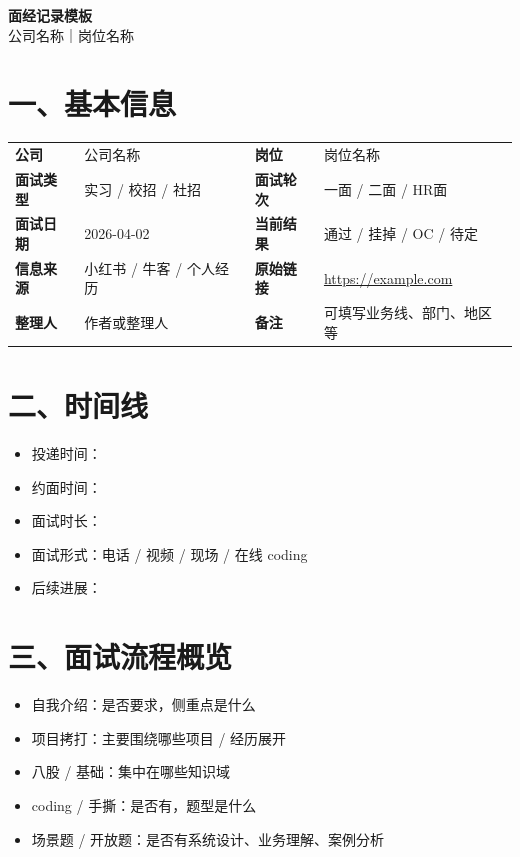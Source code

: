 \documentclass[UTF8,a4paper,11pt]{ctexart}
\newcommand{\Company}{公司名称}
\newcommand{\Role}{岗位名称}
\newcommand{\InterviewType}{实习 / 校招 / 社招}
\newcommand{\RoundInfo}{一面 / 二面 / HR面}
\newcommand{\ResultInfo}{通过 / 挂掉 / OC / 待定}
\newcommand{\InterviewDate}{2026-04-02}
\newcommand{\InterviewSource}{小红书 / 牛客 / 个人经历}
\newcommand{\OriginalLink}{https://example.com}
\newcommand{\AuthorName}{作者或整理人}
\begin{document}
\begin{center}
  {\LARGE \textbf{面经记录模板}}\\[0.5em]
  {\large \Company{}｜\Role}
\end{center}

\vspace{0.8em}

\section*{一、基本信息}

\begin{tabularx}{\textwidth}{>{\bfseries}p{}X>{\bfseries}p{}X}
\toprule
公司 & \Company & 岗位 & \Role \\
面试类型 & \InterviewType & 面试轮次 & \RoundInfo \\
面试日期 & \InterviewDate & 当前结果 & \ResultInfo \\
信息来源 & \InterviewSource & 原始链接 & \url{\OriginalLink} \\
整理人 & \AuthorName & 备注 & 可填写业务线、部门、地区等 \\
\bottomrule
\end{tabularx}

\section*{二、时间线}

\begin{itemize}
  \item 投递时间：\underline{\hspace{8em}}
  \item 约面时间：\underline{\hspace{8em}}
  \item 面试时长：\underline{\hspace{8em}}
  \item 面试形式：电话 / 视频 / 现场 / 在线 coding
  \item 后续进展：\underline{\hspace{18em}}
\end{itemize}

\section*{三、面试流程概览}

\begin{itemize}
  \item 自我介绍：是否要求，侧重点是什么
  \item 项目拷打：主要围绕哪些项目 / 经历展开
  \item 八股 / 基础：集中在哪些知识域
  \item coding / 手撕：是否有，题型是什么
  \item 场景题 / 开放题：是否有系统设计、业务理解、案例分析
\end{itemize}
\end{document}

